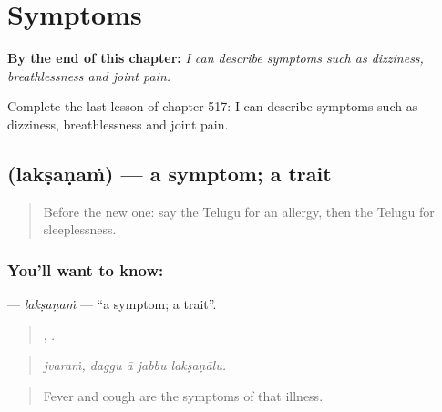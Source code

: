 
\chapter{Symptoms}
\label{ch:te-symptoms}

\begin{chapteropening}
\textbf{By the end of this chapter:} \emph{I can describe symptoms such as dizziness, breathlessness and joint pain.}

Complete the last lesson of chapter 517: I can describe symptoms such as dizziness, breathlessness and joint pain.
\end{chapteropening}

\section[\texorpdfstring{\te{లక్షణం} (lakṣaṇaṁ)}{లక్షణం (lakṣaṇaṁ)}]{ (lakṣaṇaṁ) — a symptom; a trait}

\label{lesson:TE-C517-laksanam}



\begin{quote}
Before the new one: say the Telugu for an allergy, then the Telugu for sleeplessness.
\end{quote}

\subsection*{You'll want to know: }
\textbf{} — \emph{lakṣaṇaṁ} — \textquotedblleft{}a symptom; a trait\textquotedblright{}.

\begin{quote}
,    .
\end{quote}

\begin{quote}
\emph{jvaraṁ, daggu ā jabbu lakṣaṇālu.}
\end{quote}

\begin{quote}
Fever and cough are the symptoms of that illness.
\end{quote}

